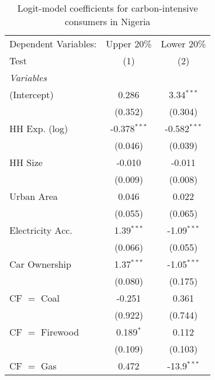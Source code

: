 
\begin{table}[htbp!]
   \centering
   \small
   \begin{adjustbox}{width = 1\textwidth, max height = 0.95\textheight, center}
      \begin{threeparttable}[b]
         \caption{\label{tab:Logit_1_NGA} Logit-model coefficients for carbon-intensive consumers in Nigeria}
         \begin{tabular}{lcc}
            \tabularnewline \midrule \midrule
            Dependent Variables:  & Upper 20\%     & Lower 20\%\\   
            Test                  & (1)            & (2)\\  
            \midrule
            \emph{Variables}\\
            (Intercept)           & 0.286          & 3.34$^{***}$\\   
                                  & (0.352)        & (0.304)\\   
            HH Exp. (log)         & -0.378$^{***}$ & -0.582$^{***}$\\   
                                  & (0.046)        & (0.039)\\   
            HH Size               & -0.010         & -0.011\\   
                                  & (0.009)        & (0.008)\\   
            Urban Area            & 0.046          & 0.022\\   
                                  & (0.055)        & (0.065)\\   
            Electricity Acc.      & 1.39$^{***}$   & -1.09$^{***}$\\   
                                  & (0.066)        & (0.055)\\   
            Car Ownership         & 1.37$^{***}$   & -1.05$^{***}$\\   
                                  & (0.080)        & (0.175)\\   
            CF $=$ Coal           & -0.251         & 0.361\\   
                                  & (0.922)        & (0.744)\\   
            CF $=$ Firewood       & 0.189$^{*}$    & 0.112\\   
                                  & (0.109)        & (0.103)\\   
            CF $=$ Gas            & 0.472          & -13.9$^{***}$\\   

\end{tabular}
\end{threeparttable}
\end{adjustbox}
\end{table}
